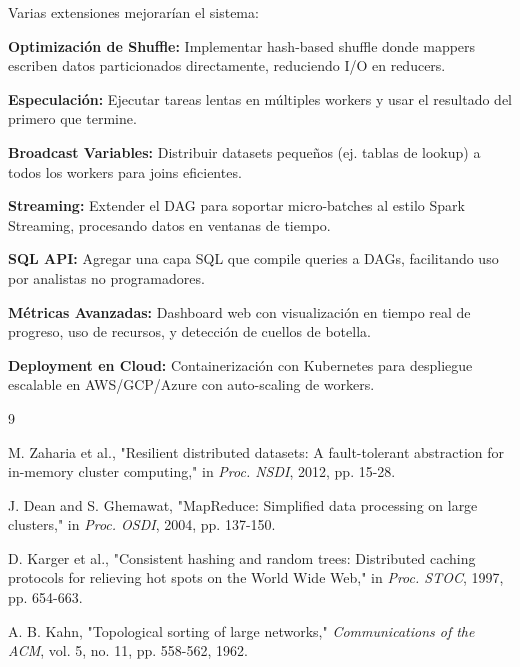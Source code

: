 \documentclass[conference]{IEEEtran}
\begin{document}
Varias extensiones mejorarían el sistema:

\textbf{Optimización de Shuffle:} Implementar hash-based shuffle donde mappers escriben datos particionados directamente, reduciendo I/O en reducers.

\textbf{Especulación:} Ejecutar tareas lentas en múltiples workers y usar el resultado del primero que termine.

\textbf{Broadcast Variables:} Distribuir datasets pequeños (ej. tablas de lookup) a todos los workers para joins eficientes.

\textbf{Streaming:} Extender el DAG para soportar micro-batches al estilo Spark Streaming, procesando datos en ventanas de tiempo.

\textbf{SQL API:} Agregar una capa SQL que compile queries a DAGs, facilitando uso por analistas no programadores.

\textbf{Métricas Avanzadas:} Dashboard web con visualización en tiempo real de progreso, uso de recursos, y detección de cuellos de botella.

\textbf{Deployment en Cloud:} Containerización con Kubernetes para despliegue escalable en AWS/GCP/Azure con auto-scaling de workers.




\begin{thebibliography}{9}

M. Zaharia et al., "Resilient distributed datasets: A fault-tolerant abstraction for in-memory cluster computing," in \textit{Proc. NSDI}, 2012, pp. 15-28.

J. Dean and S. Ghemawat, "MapReduce: Simplified data processing on large clusters," in \textit{Proc. OSDI}, 2004, pp. 137-150.

D. Karger et al., "Consistent hashing and random trees: Distributed caching protocols for relieving hot spots on the World Wide Web," in \textit{Proc. STOC}, 1997, pp. 654-663.

A. B. Kahn, "Topological sorting of large networks," \textit{Communications of the ACM}, vol. 5, no. 11, pp. 558-562, 1962.

\end{thebibliography}
\end{document}
